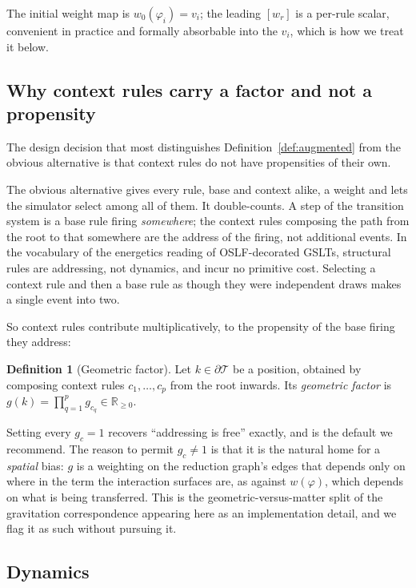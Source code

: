 \documentclass[11pt,a4paper]{article}
\theoremstyle{plain}
\theoremstyle{definition}
\newtheorem{definition}[theorem]{Definition}
\theoremstyle{remark}
\newcommand{\Rnn}{\mathbb{R}_{\geq 0}}
\newcommand{\Terms}{\mathcal{T}}
\newcommand{\wmap}{w}
\newcommand{\gfac}{g}
\begin{document}
The initial weight map is $\wmap_0(\varphi_i) = v_i$; the leading $[\wmap_r]$ is a per-rule scalar,
convenient in practice and formally absorbable into the $v_i$, which is how we treat it below.

\subsection{Why context rules carry a factor and not a propensity}
\label{sec:geometric}

The design decision that most distinguishes Definition~\ref{def:augmented} from the obvious
alternative is that context rules do not have propensities of their own.

The obvious alternative gives every rule, base and context alike, a weight and lets the simulator
select among all of them. It double-counts. A step of the transition system is a base rule firing
\emph{somewhere}; the context rules composing the path from the root to that somewhere are the
address of the firing, not additional events. In the vocabulary of the energetics reading of
OSLF-decorated GSLTs, structural rules are addressing, not dynamics, and incur no primitive cost.
Selecting a context rule and then a base rule as though they were independent draws makes a single
event into two.

So context rules contribute multiplicatively, to the propensity of the base firing they address:

\begin{definition}[Geometric factor]
\label{def:gfac}
Let $k \in \partial\Terms$ be a position, obtained by composing context rules $c_1, \ldots, c_p$
from the root inwards. Its \emph{geometric factor} is
$\gfac(k) = \prod_{q=1}^{p} \gfac_{c_q} \in \Rnn$.
\end{definition}

Setting every $\gfac_c = 1$ recovers ``addressing is free'' exactly, and is the default we recommend.
The reason to permit $\gfac_c \neq 1$ is that it is the natural home for a \emph{spatial} bias:
$\gfac$ is a weighting on the reduction graph's edges that depends only on where in the term the
interaction surfaces are, as against $\wmap(\varphi)$, which depends on what is being transferred.
This is the geometric-versus-matter split of the gravitation correspondence \cite{costspacetime}
appearing here as an implementation detail, and we flag it as such without pursuing it.

\subsection{Dynamics}
\label{sec:dynamic}
\end{document}
